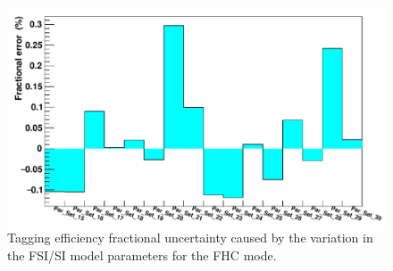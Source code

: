 \begin{figure}[H]
    \includegraphics[scale=0.4]{Figures/fsisi_uncertainty.png}
\caption{Tagging efficiency fractional uncertainty caused by the variation in the FSI/SI model parameters for the FHC mode.}
\label{fig:fsisiuncertainty}
\end{figure}

